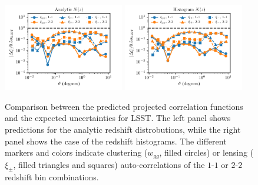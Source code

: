 \documentclass[\docopts]{\docclass}
\begin{document}
\begin{figure}
\centering
\includegraphics[width=0.47\textwidth]{projected_correlation_error_comparison_analytic} 
\includegraphics[width=0.47\textwidth]{projected_correlation_error_comparison_histo} 
\caption{Comparison between the predicted projected correlation functions and the expected uncertainties for LSST. The left panel shows predictions for the analytic redshift distrobutions, while the right panel shows the case of the redshift histograms. The different markers and colors indicate clustering ($w_{gg}$, filled circles) or lensing ($\xi_{\pm}$, filled triangles and squares) auto-correlations of the $1$-$1$ or $2$-$2$ redshift bin combinations.}
\label{fig:corrval}
\end{figure}
\end{document}
